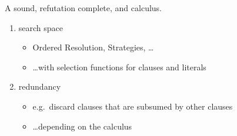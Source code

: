 \begin{goal}
A sound, refutation complete, and
\pause {} calculus.
\begin{enumerate}
	\pause
	\item {} search space
	\begin{itemize}
		\pause
		\item Ordered Resolution, Strategies, \ldots
		\pause
		\item \ldots with selection functions for clauses and literals
	\end{itemize}
	\pause
	\item {} redundancy
	\begin{itemize}
		\pause
		\item e.g.~discard clauses that are subsumed by other clauses
		\pause
		\item \ldots depending on the calculus
	\end{itemize}
\end{enumerate}
\end{goal}